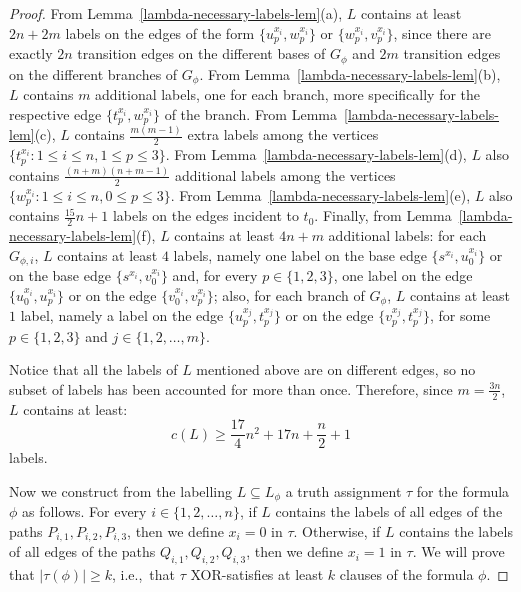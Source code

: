 \documentclass[a4paper,UKenglish]{article}
\begin{document}
\begin{proof}
From Lemma~\ref{lambda-necessary-labels-lem}(a), $L$ contains at least $2n+2m$ labels on the edges of the form $\{u_p^{x_i}, w_p^{x_i}\}$ or $\{w_p^{x_i}, v_p^{x_i}\}$, since there are exactly $2n$ transition edges on the different bases of $G_\phi$ and $2m$ transition edges on the different branches of $G_\phi$. From Lemma~\ref{lambda-necessary-labels-lem}(b), $L$ contains $m$ additional labels, one for each branch, more specifically for the respective edge $\{t_p ^{x_i}, w_p ^{x_i} \}$ of the branch. From Lemma~\ref{lambda-necessary-labels-lem}(c), $L$ contains $\frac{m(m-1)}{2}$ extra labels among the vertices $\{t_p^{x_i}: 1 \leq i \leq n, 1 \leq p \leq 3\}$.
From Lemma~\ref{lambda-necessary-labels-lem}(d), $L$ also contains $\frac{(n+m) (n+m-1)}{2}$ additional labels among the vertices $\{w_p^{x_i}: 1\leq i \leq n, 0\leq p \leq 3 \}$. From Lemma~\ref{lambda-necessary-labels-lem}(e), $L$ also contains $\frac{15}{2}n+1$ labels on the edges incident to $t_0$. Finally, from Lemma~\ref{lambda-necessary-labels-lem}(f), $L$ contains at least $4n+m$ additional labels: for each $G_{\phi,i}$, $L$ contains at least $4$ labels, namely one label on the base edge $\{s^{x_i}, u_0^{x_i}\}$ or on the base edge $\{s^{x_i}, v_0^{x_i}\}$ and, for every $p\in \{1,2,3\}$, one label on the edge $\{u_0^{x_i},u_p^{x_i}\}$ or on the edge $\{v_0^{x_i},v_p^{x_i}\}$; also, for each branch of $G_\phi$, $L$ contains at least $1$ label, namely a label on the edge $\{u_p^{x_j}, t_p^{x_j}\}$ or on the edge $\{v_p^{x_j}, t_p^{x_j}\}$, for some $p\in \{1,2,3\}$ and $j \in \{1,2,\ldots, m\}$.

Notice that all the labels of $L$ mentioned above are on different edges, so no subset of labels has been accounted for more than once. Therefore, since $m=\frac{3n}{2}$, $L$ contains at least:
\begin{equation}
c(L) \geq \frac{17}{4} n^2 +17n +\frac{n}{2} +1
\label{eq-1}
\end{equation}
labels.

Now we construct from the labelling $L \subseteq L _{\phi }$ a
truth assignment $\tau $ for the formula $\phi $ as follows. For every $i\in
\{1,2,\ldots ,n\}$, if $L $ contains the labels of all edges of the
paths $P_{i,1},P_{i,2},P_{i,3}$, then we define $x_{i}=0$ in $\tau $.
Otherwise, if $L $ contains the labels of all edges of the paths $Q_{i,1},Q_{i,2},Q_{i,3}$, then we define $x_{i}=1$ in $\tau $. We will prove
that $|\tau (\phi )|\geq k$, i.e.,~that $\tau $ XOR-satisfies at least $k$
clauses of the formula $\phi $.


\end{proof}
\end{document}
